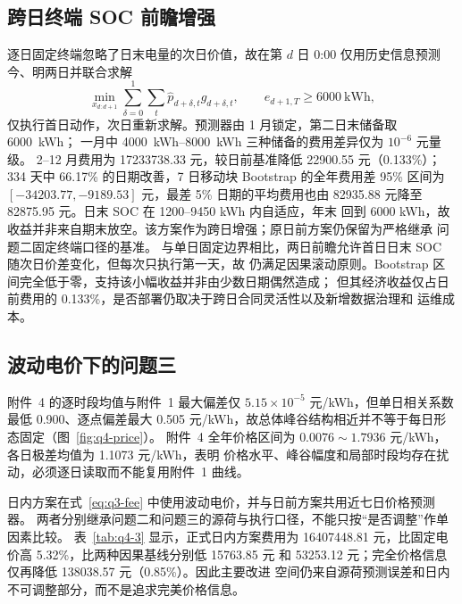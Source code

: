 \documentclass[withoutpreface,bwprint]{cumcmthesis}
\begin{document}
\subsection{跨日终端 SOC 前瞻增强}

逐日固定终端忽略了日末电量的次日价值，故在第 $d$ 日 0:00 仅用历史信息预测今、明两日并联合求解
\begin{equation}
 \min_{x_{d:d+1}}\sum_{\delta=0}^{1}\sum_t
 \widehat p_{d+\delta,t}g_{d+\delta,t},\qquad
 e_{d+1,T}\ge6000\ \mathrm{kWh},
 \label{eq:q4-two-day}
\end{equation}
仅执行首日动作，次日重新求解。预测器由 1 月锁定，第二日末储备取 \SI{6000}{kWh}；
一月中 \SIrange{4000}{8000}{kWh} 三种储备的费用差异仅为 $10^{-6}$ 元量级。
2--12 月费用为 \num{17233738.33} 元，较日前基准降低 \num{22900.55} 元（0.133\%）；
334 天中 66.17\% 的日期改善，7 日移动块 Bootstrap 的全年费用差 95\% 区间为
$[-\num{34203.77},-\num{9189.53}]$ 元，最差 5\% 日期的平均费用也由
\num{82935.88} 元降至 \num{82875.95} 元。日末 SOC 在 1200--9450 kWh 内自适应，年末
回到 6000 kWh，故收益并非来自期末放空。该方案作为跨日增强；原日前方案仍保留为严格继承
问题二固定终端口径的基准。
与单日固定边界相比，两日前瞻允许首日日末 SOC 随次日价差变化，但每次只执行第一天，故
仍满足因果滚动原则。Bootstrap 区间完全低于零，支持该小幅收益并非由少数日期偶然造成；
但其经济收益仅占日前费用的 0.133\%，是否部署仍取决于跨日合同灵活性以及新增数据治理和
运维成本。

\subsection{波动电价下的问题三}

附件~4 的逐时段均值与附件~1 最大偏差仅 $5.15\times10^{-5}$ 元/kWh，但单日相关系数最低
0.900、逐点偏差最大 0.505 元/kWh，故总体峰谷结构相近并不等于每日形态固定（图~\ref{fig:q4-price}）。
附件~4 全年价格区间为 $0.0076\sim1.7936$ 元/kWh，各日极差均值为 1.1073 元/kWh，表明
价格水平、峰谷幅度和局部时段均存在扰动，必须逐日读取而不能复用附件~1 曲线。

日内方案在式~\eqref{eq:q3-fee} 中使用波动电价，并与日前方案共用近七日价格预测器。
两者分别继承问题二和问题三的源荷与执行口径，不能只按“是否调整”作单因素比较。
表~\ref{tab:q4-3} 显示，正式日内方案费用为
\num{16407448.81} 元，比固定电价高 5.32\%，比两种因果基线分别低 \num{15763.85} 元
和 \num{53253.12} 元；完全价格信息仅再降低 \num{138038.57} 元（0.85\%）。因此主要改进
空间仍来自源荷预测误差和日内不可调整部分，而不是追求完美价格信息。
\end{document}
